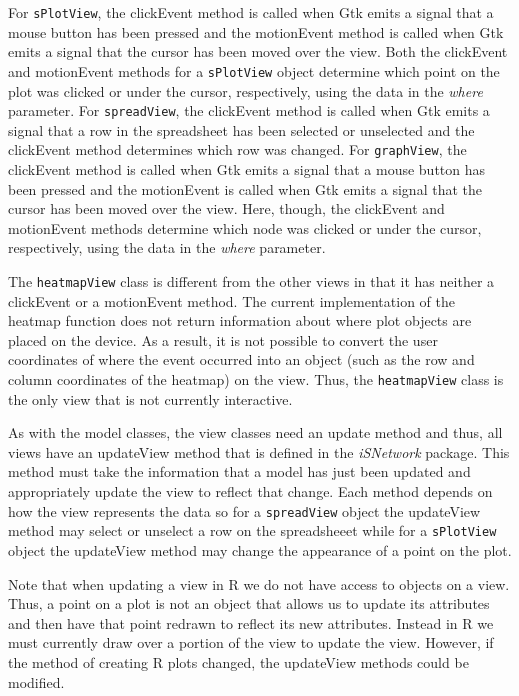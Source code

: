 \documentclass{article}[11pt]
\newcommand{\Rfunction}[1]{{\textsf{#1}}}
\newcommand{\Robject}[1]{{\texttt{#1}}}
\newcommand{\Rpackage}[1]{{\textit{#1}}}
\newcommand{\Rslot}[1]{\textsl{#1}}
\newcommand{\Rclass}[1]{\texttt{#1}}
\begin{document}
For \Rclass{sPlotView}, the \Rfunction{clickEvent} method is called when Gtk
emits a signal that a mouse button has been pressed and the
\Rfunction{motionEvent} method is called when Gtk emits a signal that
the cursor has been moved over the view.  Both the \Rfunction{clickEvent} and
\Rfunction{motionEvent} methods for a \Robject{sPlotView} object
determine which point on the plot was clicked or under the cursor,
respectively, using the data in the \Rslot{where} parameter.  For
\Rclass{spreadView}, the \Rfunction{clickEvent} method is called when Gtk
emits a signal that a row in the spreadsheet has been selected or unselected
and the \Rfunction{clickEvent} method determines which row was changed.
For \Rclass{graphView}, the \Rfunction{clickEvent} method is called when Gtk
emits a signal that a mouse button has been pressed and the
\Rfunction{motionEvent} is called when Gtk emits a signal that the cursor has
been moved over the view.  Here, though, the \Rfunction{clickEvent} and
\Rfunction{motionEvent} methods determine which node was clicked or under
the cursor, respectively, using the data in the \Rslot{where} parameter.  

The \Rclass{heatmapView} class is different from the other views in that it
has neither a \Rfunction{clickEvent} or a \Rfunction{motionEvent} method.  The
current implementation of the \Rfunction{heatmap} function does not return
information about where plot objects are placed on the device.  As a result,
it is not possible to convert the user coordinates of where the event occurred
into an object (such as the row and column coordinates of the heatmap) on
the view.  Thus, the \Rclass{heatmapView} class is the only view that is not
currently interactive.  

As with the model classes, the view classes need an update
method and thus, all views have an \Rfunction{updateView} method that is
defined in the \Rpackage{iSNetwork} package.  This method must take the
information that a model has just been updated and appropriately update the
view to reflect that change.  Each method depends on how the view
represents the data so for a \Robject{spreadView} object the
\Rfunction{updateView} method may select or unselect a row on the spreadsheeet
while for a \Robject{sPlotView} object the \Rfunction{updateView} method may
change the appearance of a point on the plot.  

Note that when updating a view in R we do not have access to objects on a
view.  Thus, a point on a plot is not an object that allows us to update its
attributes and then have that point redrawn to reflect its new attributes.
Instead in R we must currently draw over a portion of the view to update the
view.  However, if the method of creating R plots changed, the
\Rfunction{updateView} methods could be modified. 
\end{document}
